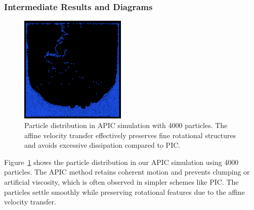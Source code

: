 \subsubsection{Intermediate Results and Diagrams}
\begin{figure}[h]
    \centering
    \includegraphics[width=0.45\textwidth]{figures/apic4000.png}
    \caption{Particle distribution in APIC simulation with 4000 particles. The affine velocity transfer effectively preserves fine rotational structures and avoids excessive dissipation compared to PIC.}
    \label{fig:apic4000}
\end{figure}

Figure~\ref{fig:apic4000} shows the particle distribution in our APIC simulation using 4000 particles. The APIC method retains coherent motion and prevents clumping or artificial viscosity, which is often observed in simpler schemes like PIC. The particles settle smoothly while preserving rotational features due to the affine velocity transfer.